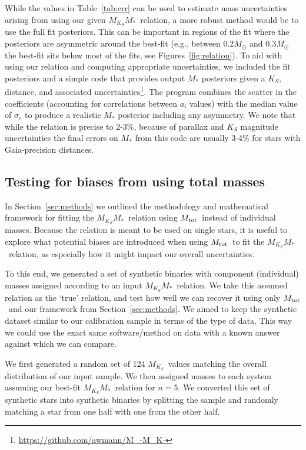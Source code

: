 \documentclass[twocolumn]{aastex62}
\newcommand{\mks}{$M_{K_S}$}
\newcommand{\mmk}{$M_{K_S}$\textendash$M_*$}
\newcommand{\order}{5}
\newcommand{\mtot}{$M_{\rm{tot}}$}
\begin{document}
While the values in Table~\ref{tab:err} can be used to estimate mass uncertainties arising from using our given \mmk\ relation, a more robust method would be to use the full fit posteriors. This can be important in regions of the fit where the posteriors are asymmetric around the best-fit (e.g., between 0.2$M_\odot$  and 0.3$M_\odot$ the best-fit sits below most of the fits, see Figures~\ref{fig:relation}). To aid with using our relation and computing appropriate uncertainties, we included the fit posteriors and a simple code that provides output $M_*$ posteriors given a $K_S$, distance, and associated uncertainties\footnote{\href{https://github.com/awmann/M_-M_K-}{https://github.com/awmann/M\_-M\_K-}}. The program combines the scatter in the coefficients (accounting for correlations between $a_i$ values) with the median value of $\sigma_e$ to produce a realistic $M_*$ posterior including any asymmetry. We note that while the relation is precise to 2-3\%, because of parallax and $K_S$ magnitude uncertainties the final errors on $M_*$ from this code are usually 3-4\% for stars with Gaia-precision distances. 


\subsection{Testing for biases from using total masses}\label{sec:totalvsind}
In Section~\ref{sec:methods} we outlined the methodology and mathematical framework for fitting the \mmk\ relation using \mtot\ instead of individual masses. Because the relation is meant to be used on single stars, it is useful to explore what potential biases are introduced when using \mtot\ to fit the \mmk\ relation, as especially how it might impact our overall uncertainties. 

To this end, we generated a set of synthetic binaries with component (individual) masses assigned according to an input \mmk\ relation. We take this assumed relation as the `true' relation, and test how well we can recover it using only \mtot\ and our framework from Section~\ref{sec:methods}. We aimed to keep the synthetic dataset similar to our calibration sample in terms of the type of data. This way we could use the exact same software/method on data with a known answer against which we can compare. 

We first generated a random set of 124 \mks\ values matching the overall distribution of our input sample. We then assigned masses to each system assuming our best-fit \mmk\ relation for $n=\order$.  We converted this set of synthetic stars into synthetic binaries by splitting the sample and randomly matching a star from one half with one from the other half. 
\end{document}
